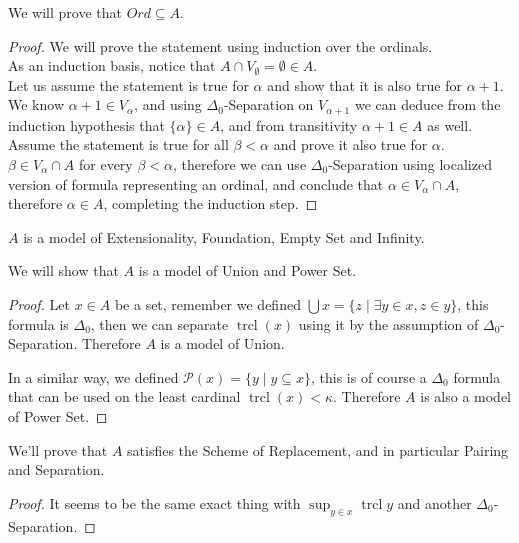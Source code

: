 \subquestion{}
We will prove that $Ord \subseteq A$.
\begin{proof}
	We will prove the statement using induction over the ordinals. \\
	As an induction basis, notice that $A \cap V_\emptyset = \emptyset \in A$. \\
	Let us assume the statement is true for $\alpha$ and show that it is also true for $\alpha + 1$.
	We know $\alpha + 1 \in V_{\alpha}$, and using $\Delta_0$-Separation on $V_{\alpha + 1}$ we can deduce from the induction hypothesis that $\{\alpha\} \in A$, and from transitivity $\alpha + 1 \in A$ as well. \\
	Assume the statement is true for all $\beta < \alpha$ and prove it also true for $\alpha$.
	$\beta \in V_\alpha \cap A$ for every $\beta < \alpha$, therefore we can use $\Delta_0$-Separation using localized version of formula representing an ordinal,
	and conclude that $\alpha \in V_\alpha \cap A$, therefore $\alpha \in A$, completing the induction step.
\end{proof}
\begin{remark}
	$A$ is a model of Extensionality, Foundation, Empty Set and Infinity.
\end{remark}

\subquestion{}
We will show that $A$ is a model of Union and Power Set.
\begin{proof}
	Let $x \in A$ be a set, remember we defined $\bigcup x = \{ z \mid \exists y \in x, z \in y \}$, this formula is $\Delta_0$, then we can separate $\operatorname{trcl}(x)$ using it by the assumption of $\Delta_0$-Separation.
	Therefore $A$ is a model of Union.

	In a similar way, we defined $\mathcal{P}(x) = \{ y \mid y \subseteq x \}$, this is of course a $\Delta_0$ formula that can be used on the least cardinal $\operatorname{trcl}(x) < \kappa$.
	Therefore $A$ is also a model of Power Set.
\end{proof}

\subquestion{}
We'll prove that $A$ satisfies the Scheme of Replacement, and in particular Pairing and Separation.
\begin{proof}
	It seems to be the same exact thing with $\sup_{y \in x} \operatorname{trcl} y$ and another $\Delta_0$-Separation.
\end{proof}


